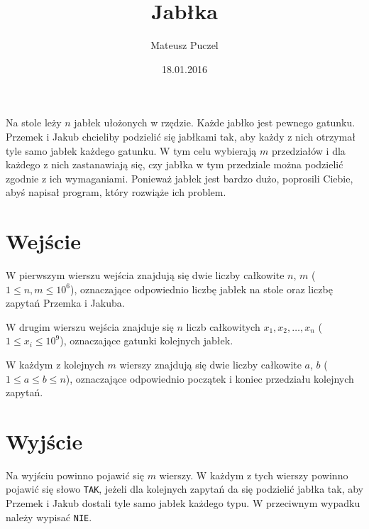 \documentclass[zad,zawodnik,utf8]{sinol}
\title{Jabłka}
\author{Mateusz Puczel} %
\date{18.01.2016}
\begin{document}
\begin{tasktext}%
Na stole leży $n$ jabłek ułożonych w rzędzie. Każde jabłko jest pewnego gatunku. Przemek i Jakub chcieliby podzielić się jabłkami tak,
aby każdy z nich otrzymał tyle samo jabłek każdego gatunku. W tym celu wybierają $m$ przedziałów i dla każdego z nich zastanawiają się, czy jabłka w tym przedziale
można podzielić zgodnie z ich wymaganiami. Ponieważ jabłek jest bardzo dużo, poprosili Ciebie, abyś napisał program, który rozwiąże ich problem.

  \section{Wejście}
W pierwszym wierszu wejścia znajdują się dwie liczby całkowite $n$, $m$ ($1 \leq n, m \leq 10^6$), oznaczające odpowiednio liczbę jabłek na stole
oraz liczbę zapytań Przemka i Jakuba.

W drugim wierszu wejścia znajduje się $n$ liczb całkowitych $x_1, x_2, \ldots, x_n$ ($1 \leq x_i \leq 10^9$), oznaczające gatunki kolejnych jabłek.

W każdym z kolejnych $m$ wierszy znajdują się dwie liczby całkowite $a$, $b$ ($1 \leq a \leq b \leq n$), oznaczające odpowiednio początek i koniec przedziału kolejnych zapytań.
  \section{Wyjście}
Na wyjściu powinno pojawić się $m$ wierszy. W każdym z tych wierszy powinno pojawić się słowo \texttt{TAK}, jeżeli dla kolejnych zapytań da się
podzielić jabłka tak, aby Przemek i Jakub dostali tyle samo jabłek każdego typu. W przeciwnym wypadku należy wypisać \texttt{NIE}.
\makecompactexample

\end{tasktext}
\end{document}
